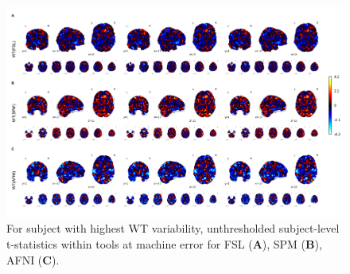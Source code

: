 \documentclass[11pt,onecolumn]{article}
\begin{document}
\begin{figure}[ht]
  \centering
  \includegraphics[width=\textwidth]{figures/plots/wt-tstats/5-framed.png}
  \caption{For subject with highest WT variability, unthresholded subject-level t-statistics
  within tools at machine error for FSL (\textbf{A}),
  SPM (\textbf{B}), AFNI (\textbf{C}).}
  \label{fig:unthresh-worst-sbj}
\end{figure}
\end{document}

